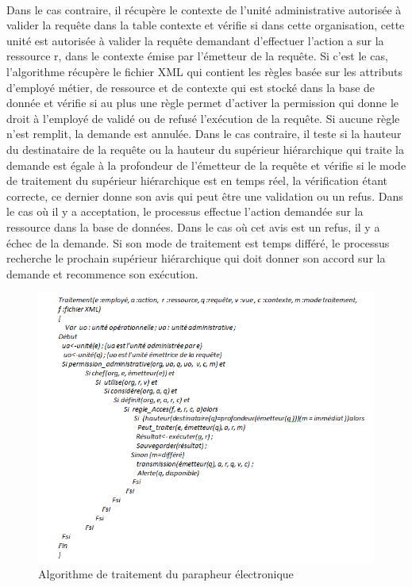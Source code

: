 \paragraph{} Dans le cas contraire, il récupère le contexte de l'unité administrative autorisée à valider la requête dans la table contexte et vérifie si dans cette organisation, cette unité est autorisée à valider la requête demandant d'effectuer l'action a sur la ressource r, dans le contexte émise par l'émetteur de la requête. Si c'est le cas, l'algorithme récupère le fichier XML qui contient les règles basée sur les attributs d'employé métier, de ressource et de contexte qui est stocké dans la base de donnée et vérifie si au plus une règle permet d'activer la permission qui donne le droit à l'employé de validé ou de refusé l'exécution de la requête. Si aucune règle n'est remplit, la demande est annulée. Dans le cas contraire, il teste si la hauteur du destinataire de la requête ou la hauteur du supérieur hiérarchique qui traite la demande est égale à la profondeur de l'émetteur de la requête et vérifie si le mode de traitement du supérieur hiérarchique est en temps réel, la vérification étant correcte, ce dernier donne son avis qui peut être une validation ou un refus. Dans le cas où il y a acceptation, le processus effectue l'action demandée sur la ressource dans la base de données. Dans le cas où cet avis est un refus, il y a échec de la demande. Si son mode de traitement est temps différé, le processus recherche le prochain supérieur hiérarchique qui doit donner son accord sur la demande et recommence son exécution.

\begin{figure}[h!]
    \centering
		\includegraphics[scale=0.7]{chap3/images/traitement.png}
    \caption{Algorithme de traitement du parapheur électronique}
	 \label{figtraitement}
\end{figure} 

